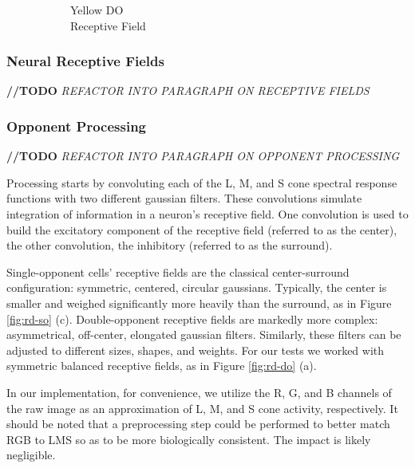 \documentclass[journal,onecolumn]{IEEEtran}
\begin{document}
\begin{figure}
\begin{subfigure}{0.3\textwidth}
{
    }
    \caption{Yellow DO \\ Receptive Field} \label{fig:do-rf-inputs-yellow}
    \end{subfigure}%
    \caption{}  \label{fig:do-rf-inputs}
\end{figure}

\subsubsection*{Neural Receptive Fields}

\textbf{//TODO} \textit{REFACTOR INTO PARAGRAPH ON RECEPTIVE FIELDS}

\subsubsection*{Opponent Processing}

\textbf{//TODO} \textit{REFACTOR INTO PARAGRAPH ON OPPONENT PROCESSING}

Processing starts by convoluting each of the L, M, and S cone spectral response functions with two different gaussian filters. These convolutions simulate integration of information in a neuron's receptive field. One convolution is used to build the excitatory component of the receptive field (referred to as the center), the other convolution, the inhibitory (referred to as the surround).

Single-opponent cells' receptive fields are the classical center-surround configuration: symmetric, centered, circular gaussians. Typically, the center is smaller and weighed significantly more heavily than the surround, as in Figure \ref{fig:rd-so} (c). Double-opponent receptive fields are markedly more complex: asymmetrical, off-center, elongated gaussian filters. Similarly, these filters can be adjusted to different sizes, shapes, and weights. For our tests we worked with symmetric balanced receptive fields, as in Figure \ref{fig:rd-do} (a).

In our implementation, for convenience, we utilize the R, G, and B channels of the raw image as an approximation of L, M, and S cone activity, respectively. It should be noted that a preprocessing step could be performed to better match RGB to LMS so as to be more biologically consistent. The impact is likely negligible.
\end{document}
